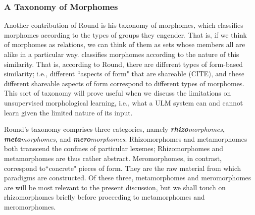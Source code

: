 


\subsubsection{A Taxonomy of Morphomes}
Another contribution of Round is his taxonomy of morphomes, which 
classifies morphomes according to the types of groups they engender. 
That is, if we think of morphomes as relations, we can think of them as 
sets whose members all are alike in a particular way. \cite{round:2015, round:md:2016} 
classifies morphomes according to the nature of this similarity. That is, 
according to Round, there are different types of form-based similarity; i.e., different ``aspects of form" that are shareable (CITE), and these different shareable aspects of form correspond to different types of morphomes. 
This sort of taxonomy will prove useful when we discuss the 
limitations on unsupervised morphological learning, i.e., what a \ac{ULM} 
system can and cannot learn given the limited nature of its input.

Round's taxonomy comprises three categories, namely 
\textit{\textbf{rhizo}morphomes}, \textit{\textbf{meta}morphomes}, and \textit{\textbf{mero}morphomes}. 
Rhizomorphomes and metamorphomes both transcend the confines of particular lexemes; Rhizomorphomes and metamorphomes are thus rather abstract. Meromorphomes, in contrast, correspond to``concrete" pieces of form. They are the raw material from which paradigms are constructed. Of these three, metamorphomes and meromorphomes are will be most relevant to the present discussion, but we shall touch on rhizomorphomes briefly before proceeding to metamorphomes and meromorphomes.

